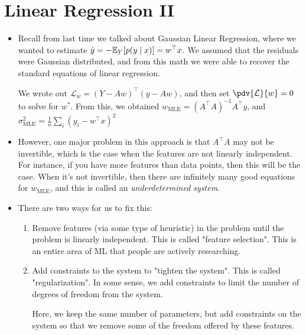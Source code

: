 \section{Linear Regression II}
\begin{itemize}
	\item Recall from last time we talked about Gaussian Linear Regression, where we
		wanted to estimate \( \hat{y} =- \mathbb E_Y[p(y \mid x)] = w^{\top} x \). We
		assumed that the residuals were Gaussian distributed, and from this math we
		were able to recover the standard equations of linear regression. 

		We wrote out \( \mathcal{L}_w = (Y - Aw)^{\top} (y - Aw) \), and then set \(
		\pdv{\mathcal{ L}}{w} = 0\) to solve for \( w^{*} \). From this, we obtained
		\( w_\text{MLE} = (A^{\top} A)^{-1} A^{\top} y \), and \( \sigma_\text{MLE}^2
		= \frac{1}{n}\sum_i (y_i - w^{\top} x)^2\)
	\item However, one major problem in this approach is that \( A^{\top} A \) may
		not be invertible, which is the case when the features are not linearly
		independent. For instance, if you have more features than data points, then
		this will be the case. When it's not invertible, then there are infinitely
		many good equations for \( w_\text{MLE} \), and this is called an
		\textit{underdetermined system}. 
	\item There are two ways for us to fix this: 
		\begin{enumerate}[label=\arabic*.]
			\item Remove features (via some type of heuristic) in the problem 
				until the problem is linearly
				independent. This is called "feature selection". This is an entire
				area of ML that people are actively researching. 
			\item Add constraints to the system to "tighten the system". This is
				called "regularization". In some sense, we add constraints to limit
				the number of degrees of freedom from the system. 

				Here, we keep the same number of parameters, but add constraints on
				the system so that we remove some of the freedom offered by these
				features. 
		\end{enumerate}
\end{itemize}

